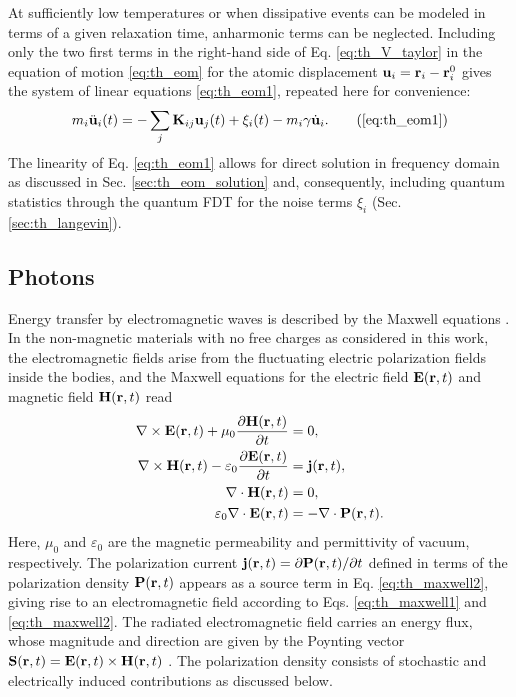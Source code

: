 At sufficiently low temperatures or when dissipative events can be modeled in terms of a given relaxation time, anharmonic terms can be neglected. Including only the two first terms in the right-hand side of Eq. \eqref{eq:th_V_taylor} in the equation of motion \eqref{eq:th_eom} for the atomic displacement $\mathbf{u}_i=\mathbf{r}_i-\mathbf{r}_i^0$ gives the system of linear equations \eqref{eq:th_eom1}, repeated here for convenience:
\begin{equation}
 m_i \ddot{\bu}_i(t) =  - \sum_j \bb{K}_{ij}\bb{u}_j(t) + \xi_i(t) - m_i \gamma \dot{\bu}_i.  \tag{\ref{eq:th_eom1}}
\end{equation}
The linearity of Eq. \eqref{eq:th_eom1} allows for direct solution in frequency domain as discussed in Sec. \ref{sec:th_eom_solution} and, consequently, including quantum statistics through the quantum FDT for the noise terms $\xi_i$ (Sec. \ref{sec:th_langevin}). 

\subsection{Photons}
\label{sec:th_eom2_photon}
Energy transfer by electromagnetic waves is described by the Maxwell equations \cite{jackson}. In the non-magnetic materials with no free charges as considered in this work, the electromagnetic fields arise from the fluctuating electric polarization fields inside the bodies, and the Maxwell equations for the electric field $\mathbf{E}(\mathbf{r},t)$ and magnetic field $\mathbf{H}(\mathbf{r},t)$ read \cite{novotny}
\begin{subequations}
\begin{align}
  \nabla \times \mathbf{E}(\mathbf{r},t) + \mu_0 \frac{\partial \mathbf{H}(\mathbf{r},t)}{\partial t} &= 0 , \label{eq:th_maxwell1} \\
  \nabla \times \mathbf{H}(\mathbf{r},t) - \varepsilon_0 \frac{\partial \mathbf{E}(\mathbf{r},t)}{\partial t} &=  \mathbf{j}(\mathbf{r},t) , \label{eq:th_maxwell2} \\
   \nabla \cdot \mathbf{H}(\mathbf{r},t) &= 0, \\
   \varepsilon_0 \nabla \cdot  \mathbf{E}(\mathbf{r},t) &= -\nabla \cdot \mathbf{P}(\mathbf{r},t).
\end{align}
\end{subequations}
Here, $\mu_0$ and $\varepsilon_0$ are the magnetic permeability and permittivity of vacuum, respectively. The polarization current $\mathbf{j}(\mathbf{r},t)=\partial \mathbf{P}(\mathbf{r},t)/\partial t$ defined in terms of the polarization density $\mathbf{P}(\mathbf{r},t)$ appears as a source term in Eq. \eqref{eq:th_maxwell2}, giving rise to an electromagnetic field according to Eqs. \eqref{eq:th_maxwell1} and \eqref{eq:th_maxwell2}. The radiated electromagnetic field carries an energy flux, whose magnitude and direction are given by the Poynting vector $\mathbf{S}(\mathbf{r},t)=\mathbf{E}(\mathbf{r},t)\times \mathbf{H}(\mathbf{r},t)$ \cite{novotny}. The polarization density consists of stochastic and electrically induced contributions \cite{benabdallah11} as discussed below. 

